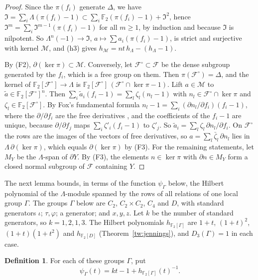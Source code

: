 \documentclass[11pt]{amsart}
\numberwithin{equation}{section}
\theoremstyle{definition}
\newtheorem{definition}[equation]{Definition}
\theoremstyle{remark}
\newcommand{\Ftwo}{\mathbb F_2}
\begin{document}
\begin{proof}
Since the $\pi(f_i)$ generate $\Delta$, we have
$\mathfrak I=\sum_i\Lambda(\pi(f_i)-1)\subset\sum_i\Ftwo(\pi(f_i)-1)+\mathfrak I^2$,
hence $\mathfrak I^m=\sum_i\mathfrak I^{m-1}(\pi(f_i)-1)$ for all $m\ge1$, by
induction and because $\mathfrak I$ is nilpotent. So
$\Lambda^n(-1)\to\mathfrak I$, $a\mapsto\sum a_i(\pi(f_i)-1)$, is strict and
surjective with kernel $\mathcal M$, and (h3) gives
$h_{\mathcal M}=nt\,h_\Lambda-(h_\Lambda-1)$.

By (F2), $\partial(\ker\pi)\subset\mathcal M$. Conversely, let
$\mathcal F^\circ\subset\mathcal F$ be the dense subgroup generated by the
$f_i$, which is a free group on them. Then $\pi(\mathcal F^\circ)=\Delta$, and
the kernel of $\Ftwo[\mathcal F^\circ]\to\Lambda$ is
$\Ftwo[\mathcal F^\circ]\,(\mathcal F^\circ\cap\ker\pi-1)$. Lift
$a\in\mathcal M$ to $\tilde a\in\Ftwo[\mathcal F^\circ]^n$. Then
$\sum_i\tilde a_i(f_i-1)=\sum_l\zeta_l(n_l-1)$ with
$n_l\in\mathcal F^\circ\cap\ker\pi$ and $\zeta_l\in\Ftwo[\mathcal F^\circ]$.
By Fox's fundamental formula
$n_l-1=\sum_i(\partial n_l/\partial f_i)(f_i-1)$, where the
$\partial/\partial f_i$ are the free derivatives \cite[Section~2]{Fox1953},
and the coefficients of the $f_i-1$ are unique, because $\partial/\partial f_j$
maps $\sum_i\zeta'_i(f_i-1)$ to $\zeta'_j$. So
$\tilde a_i=\sum_l\zeta_l\,\partial n_l/\partial f_i$. On $\mathcal F^\circ$
the rows are the images of the vectors of free derivatives, so
$a=\sum_l\bar\zeta_l\,\partial n_l$ lies in $\Lambda\,\partial(\ker\pi)$, which
equals $\partial(\ker\pi)$ by (F3). For the remaining statements, let $M_Y$ be
the $\Lambda$-span of $\partial Y$. By (F3), the elements $n\in\ker\pi$ with
$\partial n\in M_Y$ form a closed normal subgroup of $\mathcal F$ containing
$Y$.
\end{proof}

The next lemma bounds, in terms of the function $\psi_\Gamma$ below, the
Hilbert polynomial of the $\Lambda$-module spanned by the rows of all
relations of one local group $\Gamma$. The groups
$\Gamma$ below are $C_2$, $C_2\times C_2$, $C_4$ and $D$, with standard
generators $\iota$; $\tau,\varphi$; a generator; and $x,y,z$. Let $k$ be the
number of standard generators, so $k=1,2,1,3$. The Hilbert polynomials
$h_{\Ftwo[\Gamma]}$ are $1+t$, $(1+t)^2$, $(1+t)(1+t^2)$ and $h_{\Ftwo[D]}$
(Theorem~\ref{tw:jennings}), and $D_3(\Gamma)=1$ in each case.

\begin{definition}\label{tw:psi}
For each of these groups $\Gamma$, put
\[
 \psi_\Gamma(t)=kt-1+h_{\Ftwo[\Gamma]}(t)^{-1}.
\]
\end{definition}
\end{document}

